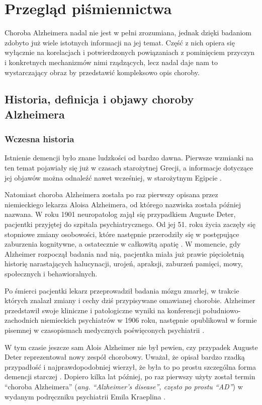 \chapter{Przegląd piśmiennictwa}

Choroba Alzheimera nadal nie jest w pełni zrozumiana, jednak dzięki badaniom zdobyto już wiele istotnych informacji na jej temat.
Część z nich opiera się wyłącznie na korelacjach i potwierdzonych powiązaniach z pominięciem przyczyn i konkretnych mechanizmów nimi rządzących, lecz nadal daje nam to wystarczający obraz by przedstawić kompleksowo opis choroby.

\section{Historia, definicja i objawy choroby Alzheimera}

\subsection{Wczesna historia}

Istnienie demencji było znane ludzkości od bardzo dawna.
Pierwsze wzmianki na ten temat pojawiały się już w czasach starożytnej Grecji, a informacje dotyczące jej objawów można odnaleźć nawet wcześniej, w starożytnym Egipcie \cite{boller1998history}.

Natomiast choroba Alzheimera została po raz pierwszy opisana przez niemieckiego lekarza Aloisa Alzheimera, od którego nazwiska została później nazwana.
W roku 1901 neuropatolog zajął się przypadkiem Auguste Deter, pacjentki przyjętej do szpitala psychiatrycznego.
Od jej 51. roku życia zaczęły się stopniowe zmiany osobowości, które następnie przerodziły się w postępujące zaburzenia kognitywne, a ostatecznie w całkowitą apatię \cite{cipriani2011alzheimer}.
W momencie, gdy Alzheimer rozpoczął badania nad nią, pacjentka miała już prawie pięcioletnią historię narastających halucynacji, urojeń, apraksji, zaburzeń pamięci, mowy, społecznych i behawioralnych.

Po śmierci pacjentki lekarz przeprowadził badania mózgu zmarłej, w trakcie których znalazł zmiany i cechy dziś przypisywane omawianej chorobie.
Alzheimer przedstawił swoje kliniczne i patologiczne wyniki na konferencji południowo-zachodnich niemieckich psychiatrów w 1906 roku, następnie opublikował w formie pisemnej w czasopismach medycznych poświęconych psychiatrii \cite{alzheimer1906uber}.

W tym czasie jeszcze sam Alois Alzheimer nie był pewien, czy przypadek Auguste Deter reprezentował nowy zespół chorobowy.
Uważał, że opisał bardzo rzadką przypadłość i najprawdopodobniej wierzył, że była to po prostu szczególna forma demencji starczej \cite{cipriani2011alzheimer}.
Dopiero kilka lat później, po raz pierwszy użyty został termin ``choroba Alzheimera'' (\emph{ang. ``Alzheimer's disease'', często po prostu ``AD''}) w wydanym podręczniku psychiatrii Emila Kraeplina \cite{kraepelin1910psychiatrie}.

